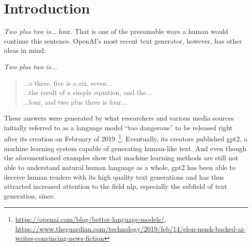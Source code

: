 \section{Introduction}
\label{ch:introduction}

\textit{Two plus two is}... four. That is one of the presumable ways a human would continue this sentence. OpenAI's most recent text generator, however, has other ideas in mind:

\textit{Two plus two is...}
\begin{quote}
	...a three, five is a six, seven... \\
	...the result of a simple equation, and the... \\
	...four, and two plus three is four...
\end{quote}
These answers were generated by what researchers and various media sources initially referred to as a language model ``too dangerous'' to be released right after its creation on February of 2019~\footnote{\url{https://openai.com/blog/better-language-models/}, \url{https://www.theguardian.com/technology/2019/feb/14/elon-musk-backed-ai-writes-convincing-news-fiction}}. Eventually, its creators published \gls{gpt2}, a machine learning system capable of generating human-like text. And even though the aforementioned examples show that machine learning methods are still not able to understand natural human language as a whole, \gls{gpt2} has been able to deceive human readers with its high quality text generations and has thus attracted increased attention to the field \gls{nlp}, especially the subfield of text generation, since.

